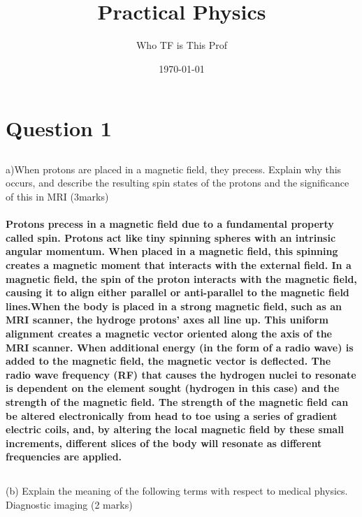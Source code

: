 \documentclass[article]{article}
\begin{document}
\title{Practical Physics}
\author{Who TF is This Prof}
\date{\today}
\maketitle
\section{Question 1}
\subsection*{} a)When protons are placed in a magnetic field, they precess. Explain why this occurs, and describe the resulting spin states of the protons and the significance of this in MRI (3marks)
\paragraph{Protons precess in a magnetic field due to a fundamental property called spin. Protons act like tiny spinning spheres with an intrinsic angular momentum. When placed in a magnetic field, this spinning creates a magnetic moment that interacts with the external field. In a magnetic field, the spin of the proton interacts with the magnetic field, causing it to align either parallel or anti-parallel to the magnetic field lines.When the body is placed in a strong magnetic field, such as an MRI scanner, the hydroge protons' axes all line up. This uniform alignment creates a magnetic vector oriented along the axis of the MRI scanner. When additional energy (in the form of a radio wave) is added to the magnetic field, the magnetic vector is deflected. The radio wave frequency (RF) that causes the hydrogen nuclei to resonate is dependent on the element sought (hydrogen in this case) and the strength of the magnetic field. The strength of the magnetic field can be altered electronically from head to toe using a series of gradient electric coils, and, by altering the local magnetic field by these small increments, different slices of the body will resonate as different frequencies are applied.}
\subsection*{}(b) Explain the meaning of the following terms with respect to medical physics.
Diagnostic imaging (2 marks)
\end{document}
